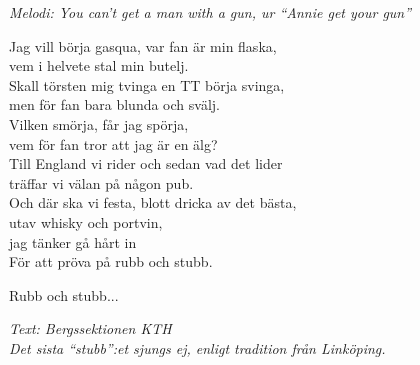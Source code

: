 {\footnotesize\textit{Melodi: You can't get a man with a gun, ur ``Annie get your gun''}}\par
\vspace{10pt}
Jag vill börja gasqua, var fan är min flaska,\\
vem i helvete stal min butelj.\\
Skall törsten mig tvinga en TT börja svinga,\\
men för fan bara blunda och svälj.\\
Vilken smörja, får jag spörja,\\
vem för fan tror att jag är en älg?\\
Till England vi rider och sedan vad det lider\\
träffar vi välan på någon pub.\\
Och där ska vi festa, blott dricka av det bästa,\\
utav whisky och portvin, \\
jag tänker gå hårt in\\
För att pröva på rubb och stubb.\par
\vspace{10pt}
Rubb och stubb...\par
\vspace{10pt}
{\footnotesize\textit{Text: Bergssektionen KTH\\
Det sista ``stubb'':et sjungs ej, enligt tradition från Linköping.}}
